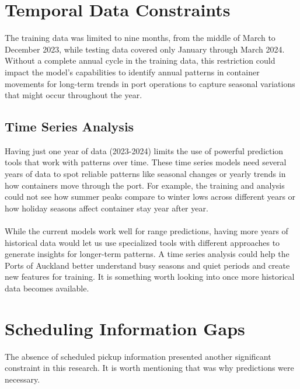 	\section{Temporal Data Constraints}

		The training data was limited to nine months, from the middle of March to December 2023, while testing data
		covered only January through March 2024. Without a complete annual cycle in the training data, this restriction
		could impact the model's capabilities to identify annual patterns in container movements for long-term
		trends in port operations to capture seasonal variations that might occur throughout the year.

		\subsection{Time Series Analysis}

			Having just one year of data (2023-2024) limits the use of powerful prediction tools that work with
			patterns over time. These time series models need several years of data to spot reliable patterns like
			seasonal changes or yearly trends in how containers move through the port. For example, the training and
			analysis could not see how summer peaks compare to winter lows across different years or how holiday
			seasons affect container stay year after year.
			\\
			\\
			While the current models work well for range predictions, having more years of historical data would let us
			use specialized tools with different approaches to generate insights for longer-term patterns. A time
			series analysis could help the Ports of Auckland better understand busy seasons and quiet periods and
			create new features for training. It is something worth looking into once more historical data becomes
			available.


	\section{Scheduling Information Gaps}

		The absence of scheduled pickup information presented another significant constraint in this research. It is
		worth mentioning that was why predictions were necessary.